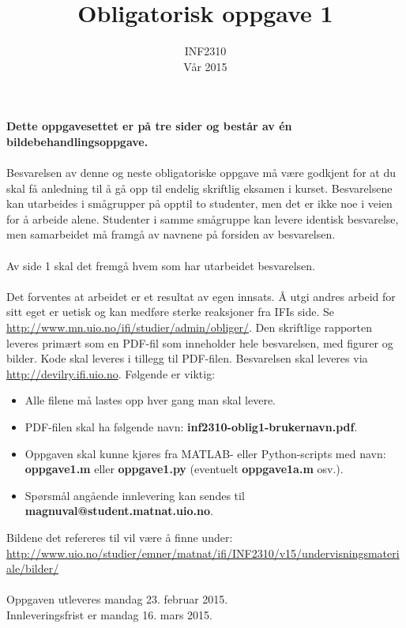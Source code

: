 \documentclass[11pt,a4paper]{article}
\title{Obligatorisk oppgave 1}
\author{INF2310 \\ Vår 2015}
\begin{document}
\maketitle{}


\textbf{Dette oppgavesettet er på tre sider og består av én bildebehandlingsoppgave.}
\\
\\
Besvarelsen av denne og neste obligatoriske oppgave må være godkjent for at du skal
få anledning til å gå opp til endelig skriftlig eksamen i kurset.
Besvarelsene kan utarbeides i smågrupper på opptil to studenter, men det er ikke
noe i veien for å arbeide alene. Studenter i samme smågruppe kan levere identisk
besvarelse, men samarbeidet må framgå av navnene på forsiden av besvarelsen.\\
\\
Av side 1 skal det fremgå hvem som har utarbeidet besvarelsen.
\\
\\
Det forventes at arbeidet er et resultat av egen innsats.
Å utgi andres arbeid for sitt eget er uetisk og kan medføre sterke reaksjoner fra IFIs
side. Se \href{http://www.mn.uio.no/ifi/studier/admin/obliger/}{http://www.mn.uio.no/ifi/studier/admin/obliger/}.
Den skriftlige rapporten leveres primært som en PDF-fil som inneholder hele
besvarelsen, med figurer og bilder. Kode skal leveres i tillegg til PDF-filen.
Besvarelsen skal leveres via \href{http://devilry.ifi.uio.no}{http://devilry.ifi.uio.no}. 
Følgende er viktig:

\begin{itemize}
\item Alle filene må lastes opp hver gang man skal levere.
\item PDF-filen skal ha følgende navn: \textbf{inf2310-oblig1-brukernavn.pdf}.
\item Oppgaven skal kunne kjøres fra MATLAB- eller Python-scripts med navn:
\textbf{oppgave1.m} eller \textbf{oppgave1.py} (eventuelt \textbf{oppgave1a.m} osv.).
\item Spørsmål angående innlevering kan sendes til \\\textbf{magnuval@student.matnat.uio.no}.
\end{itemize}

Bildene det refereres til vil være å finne under:\\
\href{http://www.uio.no/studier/emner/matnat/ifi/INF2310/v15/undervisningsmateriale/bilder/}{http://www.uio.no/studier/emner/matnat/ifi/INF2310/v15/undervisningsmateriale/bilder/}
~
\\ 
~
\\
Oppgaven utleveres mandag 23. februar 2015.\\
Innleveringsfrist er mandag 16. mars 2015.
\end{document}
